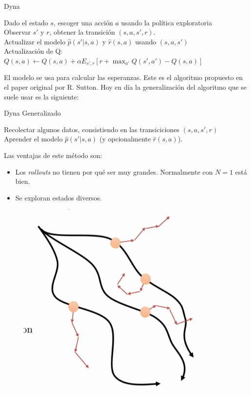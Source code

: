 \begin{algorithm}
    \caption{Dyna}
    Dado el estado $s$, escoger una acción $a$ usando la política exploratoria\\
    Observar $s'$ y $r$, obtener la transición $(s,a,s',r)$.\\
    Actualizar el modelo $\hat{p}(s'|s,a)$ y $\hat{r}(s,a)$ usando $(s,a,s')$ \\
    Actualización de Q: $Q(s,a)\gets Q(s,a)+\alpha E_{s',r}[r+\max_{a'}Q(s',a')-Q(s,a)]$\\
\end{algorithm}

El modelo se usa para calcular las esperanzas. Este es el algoritmo propuesto en el
paper original por R. Sutton. Hoy en día la generalización del algoritmo que se suele usar es la
siguiente:

\begin{algorithm}
    \caption{Dyna Generalizado}
    Recolectar algunos datos, consistiendo en las transiciciones $(s,a,s',r)$\\
    Aprender el modelo  $\hat{p}(s'|s,a)$ (y opcionalmente $\hat{r}(s,a)$).\\
\end{algorithm}

Las ventajas de este método son:
\begin{itemize}
    \item Los \textit{rollouts} no tienen por qué ser muy grandes. Normalmente con
        $N=1$ está bien.
    \item Se exploran estados diversos.
\end{itemize}

\begin{figure}[H]
	\centering
	\includegraphics[width=0.3\linewidth]{figures/2020-07-02-172155_367x377_scrot.png}
\end{figure}

